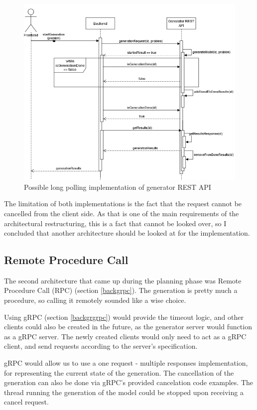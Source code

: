 \begin{itemize}
\begin{figure}
\begin{center}
				\includegraphics[scale=0.5]{include/imgs/rest_long_poll.png}
				\caption{Possible long polling implementation of generator REST API}
				\label{longpollingimage}
			\end{center}
		\end{figure}
\end{itemize}
The limitation of both implementations is the fact that the request cannot be cancelled from the client side. As that is one 
of the main requirements of the architectural restructuring, this is a fact that cannot be looked over, so I concluded that 
another architecture should be looked at for the implementation.


\subsection{Remote Procedure Call} \label{rpcconsiderations}
	The second architecture that came up during the planning phase was Remote Procedure Call (RPC) (section \ref{backgrpc}). The generation is pretty much
	a procedure, so calling it remotely sounded like a wise choice. 

	Using gRPC (section \ref{backgrgrpc}) would provide the timeout logic, and other clients
	could also be created in the future, as the generator server would function as a gRPC server. The newly created clients would only need to
	act as a gRPC client, and send requests according to the server's specification.

	gRPC would allow us to use a one request - multiple responses implementation, for representing the current state of the generation.
	The cancellation of the generation can also be done via gRPC's provided cancelation code examples. The thread running the generation of
	the model could be stopped upon receiving a cancel request.

